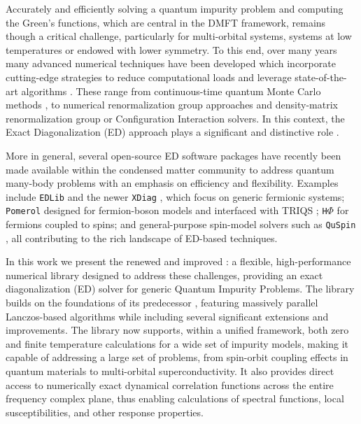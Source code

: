 \documentclass[edipack_sp.tex]{subfiles}
\begin{document}
Accurately and efficiently solving a quantum impurity problem and computing the Green's functions, which are central in the DMFT framework, remains though a
critical challenge, particularly for multi-orbital systems, systems
at low temperatures or endowed with lower symmetry.
%
To this end, over many years many advanced numerical techniques have been developed which incorporate cutting-edge strategies to reduce computational loads and leverage state-of-the-art algorithms \cite{Bauer2011JOSMTAE,Parcollet2015CPC}. 
These range from continuous-time quantum Monte Carlo 
methods \cite{Gull2011RMP,Rubtsov2005PRB,Haule2007PRB,Seth2016CPC,Wallerberger2019CPC},
to numerical renormalization group approaches \cite{Zitko2009PRB,Bulla2001PRB,Bulla2008RMP,Debertolis2021PRB} 
and density-matrix renormalization group \cite{Zitko2009PRB,Bulla2001PRB,Bulla2008RMP,Nunez-Fernandez2025A} or Configuration Interaction \cite{Zgid2012PRB,Lu2014PRB,Go2017PRB,Bi2019CPC,Mejuto-Zaera2019PRB} solvers. 
In this context, the Exact Diagonalization (ED) approach plays a significant 
and distinctive role \cite{Caffarel1994PRL,Dolfen2006,Perroni2007PRB,Capone2007PRB,Weber2012PRB,Lu2017TEPJST,Amaricci2022CPC}.

More in general, several open-source ED software packages have recently been made available  within the condensed matter community to address quantum many-body problems with an emphasis on efficiency and flexibility. Examples include \texttt{EDLib} \cite{Iskakov2017} and the newer 
\texttt{XDiag} \cite{Wietek2025}, which focus on generic fermionic systems; 
\texttt{Pomerol} \cite{Antipov2015} designed for fermion-boson models and interfaced with TRIQS \cite{Parcollet2015CPC}; \texttt{H$\Phi$} \cite{Kawamura2017CPC,Ido2024CPC} 
for fermions coupled to spins; and general-purpose spin-model solvers such as 
\texttt{QuSpin} \cite{Weinberg2017SP,Weinberg2019SP}, all contributing to the 
rich landscape of ED-based techniques.


In this work we present the renewed and improved \NAME{}: a flexible, high-performance numerical library designed to address these challenges, providing an exact diagonalization (ED) solver for generic Quantum Impurity Problems. 
The library builds on the foundations of
its predecessor \cite{Amaricci2022CPC}, featuring massively parallel Lanczos-based algorithms \cite{Lanczos1950JRNBSB,Lehoucq1998,Maschhoff1996} while including several significant extensions and improvements. The library now supports, within a unified framework, both zero and finite temperature calculations \cite{Amaricci2022CPC,Capone2007PRB} for a wide set of impurity models, making it capable of addressing a large set of problems, from spin-orbit coupling effects in quantum materials to multi-orbital superconductivity. It also provides direct
access to numerically exact dynamical correlation functions across the
entire frequency complex plane, thus enabling calculations of spectral functions, local susceptibilities, and other response properties.
\end{document}
